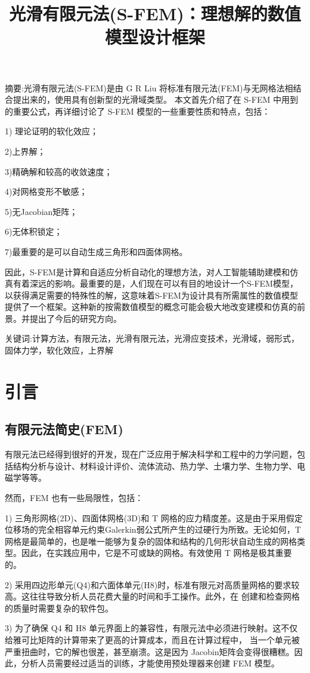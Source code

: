\documentclass[12pt,a4paper]{article}
\title{光滑有限元法(S-FEM)：理想解的数值模型设计框架}
\date{\chntoday}
\begin{document}
\maketitle
摘要:光滑有限元法(S-FEM)是由 G R Liu 将标准有限元法(FEM)与无网格法相结合提出来的，使用具有创新型的光滑域类型。
本文首先介绍了在 S-FEM 中用到的重要公式，再详细讨论了 S-FEM 模型的一些重要性质和特点，包括：

1) 理论证明的软化效应；

2)上界解；

3)精确解和较高的收敛速度；

4)对网格变形不敏感；

5)无Jacobian矩阵；

6)无体积锁定；

7)最重要的是可以自动生成三角形和四面体网格。

因此，S-FEM是计算和自适应分析自动化的理想方法，对人工智能辅助建模和仿真有着深远的影响。最重要的是，人们现在可以有目的地设计一个S-FEM模型，以获得满足需要的特殊性的解，这意味着S-FEM为设计具有所需属性的数值模型提供了一个框架。这种新的按需数值模型的概念可能会极大地改变建模和仿真的前景。并提出了今后的研究方向。

关键词:计算方法，有限元法，光滑有限元法，光滑应变技术，光滑域，弱形式，固体力学，软化效应，上界解

\section{引言}
\subsection{有限元法简史(FEM)}
有限元法已经得到很好的开发，现在广泛应用于解决科学和工程中的力学问题，包括结构分析与设计、材料设计评价、流体流动、热力学、土壤力学、生物力学、电磁学等等。

然而，FEM 也有一些局限性，包括：

1) 三角形网格(2D)、四面体网格(3D)和 T 网格的应力精度差。这是由于采用假定位移场的完全相容单元约束Galerkin弱公式所产生的过硬行为所致。无论如何，T网格是最简单的，也是唯一能够为复杂的固体和结构的几何形状自动生成的网格类型。因此，在实践应用中，它是不可或缺的网格。有效使用 T 网格是极其重要的。

2) 采用四边形单元(Q4)和六面体单元(H8)时，标准有限元对高质量网格的要求较高。这往往导致分析人员花费大量的时间和手工操作。此外，在
创建和检查网格的质量时需要复杂的软件包。

3) 为了确保 Q4 和 H8 单元界面上的兼容性，有限元法中必须进行映射。这不仅给雅可比矩阵的计算带来了更高的计算成本，而且在计算过程中，
当一个单元被严重扭曲时，它的解也很差，甚至崩溃。这是因为 Jacobin矩阵会变得很糟糕。因此，分析人员需要经过适当的训练，才能使用预处理器来创建 FEM 模型。
\end{document}
